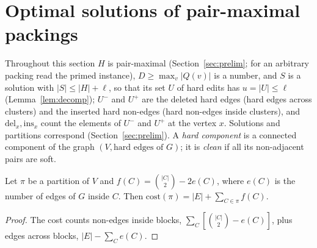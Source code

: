 \section{Optimal solutions of pair-maximal packings}\label{sec:optimal}
Throughout this section $H$ is pair-maximal (Section~\ref{sec:prelim}; for an arbitrary packing read the primed instance), $D\ge\max_v|Q(v)|$ is a number, and $S$ is a solution with $|S|\le|H|+\ell$, so that its set $U$ of hard edits has $u=|U|\le\ell$ (Lemma~\ref{lem:decomp}); $U^-$ and $U^+$ are the deleted hard edges (hard edges across clusters) and the inserted hard non-edges (hard non-edges inside clusters), and $\mathrm{del}_x,\mathrm{ins}_x$ count the elements of $U^-$ and $U^+$ at the vertex $x$. Solutions and partitions correspond (Section~\ref{sec:prelim}). A \emph{hard component} is a connected component of the graph $(V,\text{hard edges of }G)$; it is \emph{clean} if all its non-adjacent pairs are soft.

\begin{lemma}\label{lem:CP}
Let $\pi$ be a partition of $V$ and $f(C)=\binom{|C|}2-2e(C)$, where $e(C)$ is the number of edges of $G$ inside $C$. Then $\mathrm{cost}(\pi)=|E|+\sum_{C\in\pi}f(C)$.
\end{lemma}
\begin{proof}
The cost counts non-edges inside blocks, $\sum_C[\binom{|C|}2-e(C)]$, plus edges across blocks, $|E|-\sum_Ce(C)$.
\end{proof}

